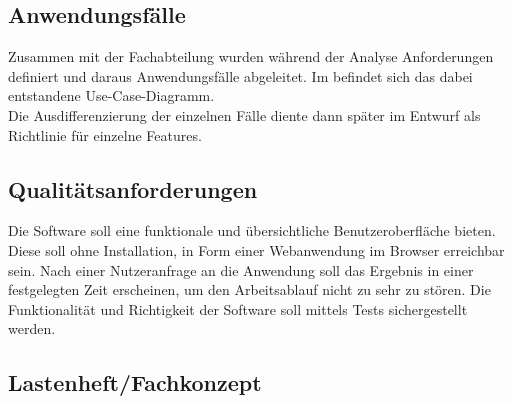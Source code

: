 \subsection{Anwendungsfälle}
\label{sec:Anwendungsfaelle}
Zusammen mit der Fachabteilung wurden während der Analyse Anforderungen definiert und daraus Anwendungsfälle
abgeleitet. Im  befindet sich das dabei entstandene Use-Case-Diagramm.\\
Die Ausdifferenzierung der einzelnen Fälle diente dann später im Entwurf als Richtlinie für einzelne Features.

\subsection{Qualitätsanforderungen}
\label{sec:Qualitaetsanforderungen}
Die Software soll eine funktionale und übersichtliche Benutzeroberfläche bieten.
Diese soll ohne Installation, in Form einer Webanwendung im Browser erreichbar sein.
Nach einer Nutzeranfrage an die Anwendung soll das Ergebnis in einer festgelegten Zeit erscheinen,
um den Arbeitsablauf nicht zu sehr zu stören.
Die Funktionalität und Richtigkeit der Software soll mittels Tests sichergestellt werden.


\subsection{Lastenheft/Fachkonzept}
\label{sec:Lastenheft}

